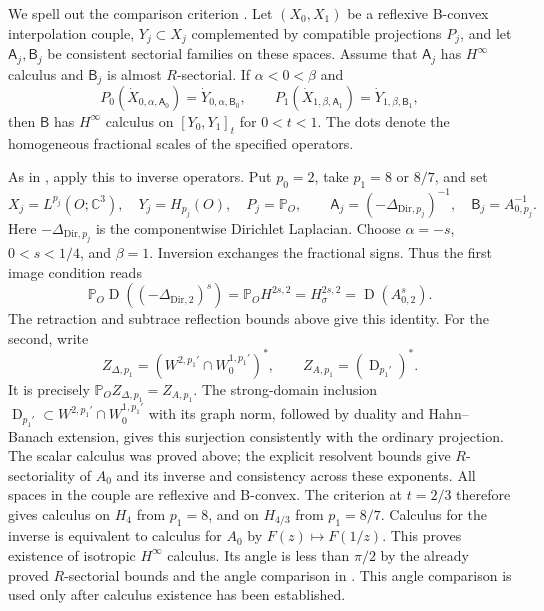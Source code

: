 \documentclass[11pt]{article}
\numberwithin{equation}{section}
\theoremstyle{remark}
\newcommand{\C}{\mathbb C}
\newcommand{\PP}{\mathbb P}
\DeclareMathOperator{\Dom}{D}
\begin{document}
We spell out the comparison criterion \cite[Theorem 8.2]{KKW}.
Let $(X_0,X_1)$ be a reflexive B-convex interpolation couple,
$Y_j\subset X_j$ complemented by compatible projections $P_j$,
and let $\mathsf A_j,\mathsf B_j$ be consistent sectorial families
on these spaces. Assume that $\mathsf A_j$ has $H^\infty$ calculus
and $\mathsf B_j$ is almost $R$-sectorial. If $\alpha<0<\beta$ and
\[
 P_0(\dot X_{0,\alpha,\mathsf A_0})
 =\dot Y_{0,\alpha,\mathsf B_0},\qquad
 P_1(\dot X_{1,\beta,\mathsf A_1})
 =\dot Y_{1,\beta,\mathsf B_1},
\]
then $\mathsf B$ has $H^\infty$ calculus on $[Y_0,Y_1]_t$ for
$0<t<1$. The dots denote the homogeneous fractional scales of the
specified operators.

As in \cite[Propositions 9.14--9.16, Theorem 9.17]{KKW}, apply this to inverse
operators. Put $p_0=2$, take $p_1=8$ or $8/7$, and set
\[
 X_j=L^{p_j}(O;\C^3),\quad Y_j=H_{p_j}(O),\quad P_j=\PP_O,
 \qquad
 \mathsf A_j=(-\Delta_{\mathrm{Dir},p_j})^{-1},\quad
 \mathsf B_j=A_{0,p_j}^{-1}.
\]
Here $-\Delta_{\mathrm{Dir},p_j}$ is the componentwise Dirichlet
Laplacian. Choose $\alpha=-s$, $0<s<1/4$, and $\beta=1$.
Inversion exchanges the fractional signs. Thus the first image
condition reads
\[
 \PP_O\Dom((-\Delta_{\mathrm{Dir},2})^s)
 =\PP_OH^{2s,2}=H^{2s,2}_\sigma=\Dom(A_{0,2}^s).
\]
The retraction and subtrace reflection bounds above give this identity.
For the second, write
\[
 Z_{\Delta,p_1}=(W^{2,p_1'}\cap W^{1,p_1'}_0)^*,\qquad
 Z_{A,p_1}=(\Dom_{p_1'})^*.
\]
It is precisely $\PP_OZ_{\Delta,p_1}=Z_{A,p_1}$.
The strong-domain inclusion
$\Dom_{p_1'}\subset W^{2,p_1'}\cap W^{1,p_1'}_0$
with its graph norm, followed by duality and Hahn--Banach extension,
gives this surjection consistently with the ordinary projection.
The scalar calculus was proved above; the explicit resolvent bounds
give $R$-sectoriality of $A_0$ and its inverse and consistency across
these exponents. All spaces in the couple are reflexive and B-convex.
The criterion at $t=2/3$ therefore gives calculus on $H_4$ from
$p_1=8$, and on $H_{4/3}$ from $p_1=8/7$. Calculus for the inverse
is equivalent to calculus for $A_0$ by $F(z)\mapsto F(1/z)$.
This proves existence of isotropic $H^\infty$ calculus. Its angle is
less than $\pi/2$ by the already
proved $R$-sectorial bounds and the angle comparison in
\cite[Theorem 4.1, Corollary 4.4]{KKW}. This angle comparison is used
only after calculus existence has been established.
\end{document}
